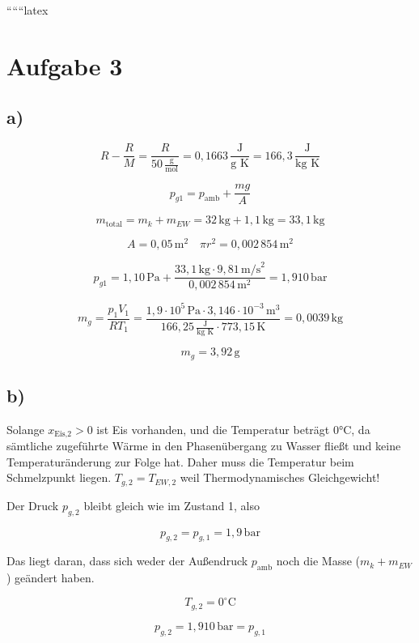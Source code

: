 
``````latex


\section*{Aufgabe 3}

\subsection*{a)}

\[
R - \frac{R}{M} = \frac{R}{50 \, \frac{\text{g}}{\text{mol}}} = 0{,}1663 \, \frac{\text{J}}{\text{g K}} = 166{,}3 \, \frac{\text{J}}{\text{kg K}}
\]

\[
p_{g1} = p_{\text{amb}} + \frac{mg}{A}
\]

\[
m_{\text{total}} = m_k + m_{EW} = 32 \, \text{kg} + 1{,}1 \, \text{kg} = 33{,}1 \, \text{kg}
\]

\[
A = 0{,}05 \, \text{m}^2 \quad \pi r^2 = 0{,}002 \, 854 \, \text{m}^2
\]

\[
p_{g1} = 1{,}10 \, \text{Pa} + \frac{33{,}1 \, \text{kg} \cdot 9{,}81 \, \text{m/s}^2}{0{,}002 \, 854 \, \text{m}^2} = 1{,}910 \, \text{bar}
\]

\[
m_g = \frac{p_1 V_1}{R T_1} = \frac{1{,}9 \cdot 10^5 \, \text{Pa} \cdot 3{,}146 \cdot 10^{-3} \, \text{m}^3}{166{,}25 \, \frac{\text{J}}{\text{kg K}} \cdot 773{,}15 \, \text{K}} = 0{,}0039 \, \text{kg}
\]

\[
m_g = 3{,}92 \, \text{g}
\]

\subsection*{b)}

Solange $x_{\text{Eis,2}} > 0$ ist Eis vorhanden, und die Temperatur beträgt 0°C, da sämtliche zugeführte Wärme in den Phasenübergang zu Wasser fließt und keine Temperaturänderung zur Folge hat. Daher muss die Temperatur beim Schmelzpunkt liegen. $T_{g,2} = T_{EW,2}$ weil Thermodynamisches Gleichgewicht!

Der Druck $p_{g,2}$ bleibt gleich wie im Zustand 1, also

\[
p_{g,2} = p_{g,1} = 1{,}9 \, \text{bar}
\]

Das liegt daran, dass sich weder der Außendruck $p_{\text{amb}}$ noch die Masse ($m_k + m_{EW}$) geändert haben.

\[
T_{g,2} = 0^\circ \text{C}
\]

\[
p_{g,2} = 1{,}910 \, \text{bar} = p_{g,1}
\]

